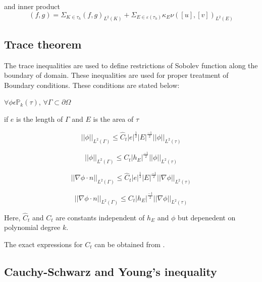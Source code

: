 \documentclass[a4paper,12pt]{book}
\begin{document}
and inner product \\

\begin{equation}
(f,g) = \Sigma_{K \in \tau_h} (f,g)_{L^2(K)} + \Sigma_{E \in \varepsilon(\tau_h)} \kappa_E \nu ([u],[v])_{L^2 (E)}
\end{equation}


\subsection{Trace theorem} \cite{riviere}

The trace inequalities are used to define restrictions of Sobolev function along the boundary of domain. These inequalities are used for proper treatment of Boundary conditions. These conditions are stated below:

$\forall \phi \epsilon \mathbb{P}_k(\tau)$, $\forall \Gamma \subset \partial \Omega$

if $e$ is the length of $\Gamma$ and $E$ is the area of $\tau$

\begin{equation}
||\phi||_{L^2(\Gamma)} \leq \hat{C}_t |e|^{\frac{1}{2}} |E|^{\frac{-1}{2}} ||\phi||_{L^2(\tau)}
\end{equation}

\begin{equation}
||\phi||_{L^2(\Gamma)} \leq {C}_t |h_E|^{\frac{-1}{2}} ||\phi||_{L^2(\tau)}
\end{equation}

\begin{equation}
||\nabla \phi \cdot n||_{L^2(\Gamma)} \leq \hat{C}_t |e|^{\frac{1}{2}} |E|^{\frac{-1}{2}} ||\nabla \phi||_{L^2(\tau)}
\end{equation}

\begin{equation}
||\nabla \phi \cdot n||_{L^2(\Gamma)} \leq {C}_t |h_E|^{\frac{-1}{2}} ||\nabla \phi||_{L^2(\tau)}
\end{equation}

Here, $\hat{C}_t$ and ${C}_t$ are constants independent of $h_E$ and $\phi$ but depenedent on polynomial degree $k$.

The exact expressions for $C_t$ can be obtained from \cite{warburton}.

\subsection{Cauchy-Schwarz and Young's inequality}\cite{riviere}
\end{document}
